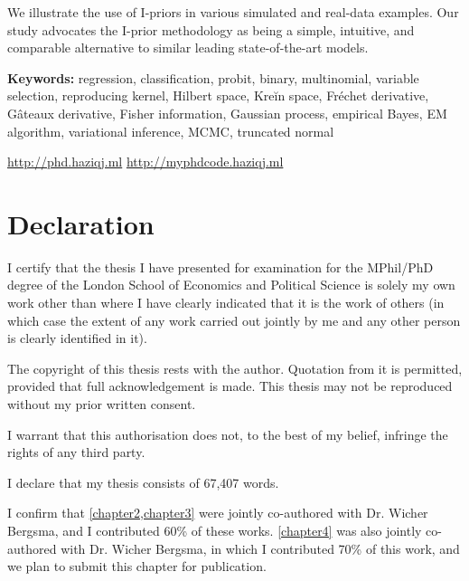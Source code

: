 \documentclass[11pt,twoside,openright]{report}
\begin{document}
We illustrate the use of I-priors in various simulated and real-data examples. 
Our study advocates the I-prior methodology as being a simple, intuitive, and comparable alternative to similar leading state-of-the-art models. 


\vspace{1em}
{\noindent\textbf{Keywords:} 
	regression, classification, probit, binary, multinomial, variable selection, reproducing kernel, Hilbert space, Kreĭn space, Fréchet derivative, Gâteaux derivative, Fisher information, Gaussian process, empirical Bayes, EM algorithm, variational inference, MCMC, truncated normal
}

\vfill

\begin{center}
  \url{http://phd.haziqj.ml} \textbullet{} \url{http://myphdcode.haziqj.ml}
\end{center}

\chapter*{Declaration} 

I certify that the thesis I have presented for examination for the MPhil/PhD degree of the London School of Economics and Political Science is solely my own work other than where I have clearly indicated that it is the work of others (in which case the extent of any work carried out jointly by me and any other person is clearly identified in it).

The copyright of this thesis rests with the author. Quotation from it is permitted, provided that full acknowledgement is made. 
This thesis may not be reproduced without my prior written consent.

I warrant that this authorisation does not, to the best of my belief, infringe the rights of any third party.

I declare that my thesis consists of 67,407 words.

I confirm that \cref{chapter2,chapter3} were jointly co-authored with Dr. Wicher Bergsma, and I contributed 60\% of these works.
\cref{chapter4} was also jointly co-authored with Dr. Wicher Bergsma, in which I contributed 70\% of this work, and we plan to submit this chapter for publication.
\end{document}
